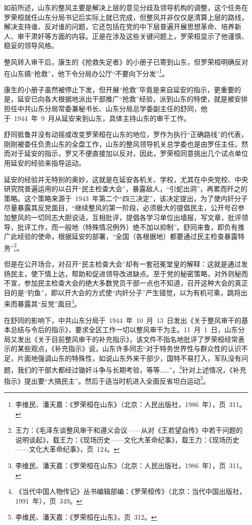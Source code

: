 如前所述，山东的整风主要是解决上层的意见分歧及领导机构的调整，这个任务在罗荣桓就任山东分局书记后实际上就已完成，但整风并非仅仅是清算上层的路线，解决支持谁、反对谁的问题，它还包括在党的中下层普遍开展思想革命、培养新人、审干肃奸等方面的内容。正是在涉及这些关键问题上，罗荣桓显示了他谨慎、稳妥的领导风格。

整风转入审干后，康生的《抢救失足者》的小册子已寄到山东，但罗荣桓明确反对在山东搞“抢救”，他下令分局办公厅“不要向下分发”\footnote{李维民、潘天嘉：《罗荣桓在山东》（北京：人民出版社，1986~年），页~311。}。

康生的小册子虽然被停止下发，但开展“抢救”毕竟是来自延安的指示，更重要的是，延安已向各大根据地派出干部推广“抢救”经验，派到山东的特使，就是被安排担任中共山东分局常委兼秘书长、山东分局总学委副主任的舒同，他于~1944~年~9~月从延安来到山东，具体主持山东的审干工作。

舒同抵鲁并没有动摇或改变罗荣桓在山东的地位，罗作为执行“正确路线”的代表，刚刚被委任负责山东的全盘工作，山东的整风领导机关总学委也是由罗任主任。然而对于延安的指示，罗又不便直接加以反对，因此，罗荣桓同意挑出几个试点单位用延安的经验来指导运动。

延安的经验并无特别的奥妙，这就是在延安各机关、学校，尤其在中央党校、中央研究院普遍运用的以召开“民主检查大会”，暴露敌人，“引蛇出洞”，再累而歼之的策略。这个策略来源于~1943~年第二个“四三决定”，该决定提出，为了使内奸分子尽量暴露其反党面目，“继续整风的第一阶段，必须极大的提倡民主，公开号召参加整风的一切同志大胆说话，互相批评，提倡各学习单位出墙报，写文章，批评领导，批评工作，而一般地（特殊情况例外）绝不加以抑制”。舒同来鲁，即负有推广此经验的使命，根据延安的部署，“全国（各根据地）都要通过民主检查暴露特务”\footnote{王力：《毛泽东谈整风审干和遵义会议——从对《王若望自传》中若干问题的说明谈起》，载王力：《现场历史——文化大革命纪事》，载王力：《现场历史——文化大革命纪事》，页~124。}。

但是在公开场合，对召开“民主检查大会”却有一套冠冕堂皇的解释：这就是通过发扬民主，使下情上达，帮助和促进领导改进缺点。至于党的秘密策略，对外则秘而不宣，参加民主检查大会的绝大多数党员干部一点也不知道，召开这种大会的真正目的是“钓鱼”，即以开大会的方式使“内奸分子”产生错觉，以为有机可乘，跳将出来而暴露其“反党”面目\footnote{李维民、潘天嘉：《罗荣桓在山东》（北京：人民出版社，1986~年），页~311。}。

在舒同的影响下，中共山东分局于~1944~年~10~月~13~日发出《关于整风审干的基本总结与令后的指示》，要求全区工作一切以整风审干为主。11~月~1~日，山东分局又发出《关于目前整风审干的补充指示》，该文件不指名地批评了罗荣桓经常表示的某些观点，《补充指示》说，山东许多同志“对于特务世界性与群众性的认识不足，片面地强调山东的特殊性，如说山东外来干部少，国特不易打入，军队没有问题，我们的干部大都经过锄奸斗争与长期考验，等等……”，\footnote{《当代中国人物传记》丛书编辑部编：《罗荣桓传》（北京：当代中国出版社，1991~年），页~349。}针对上述情况，《补充指示》提出要“大搞民主”。然后于适当时机进入全面反省坦白运动\footnote{李维民、潘天嘉：《罗荣桓在山东》，页~312。}。

